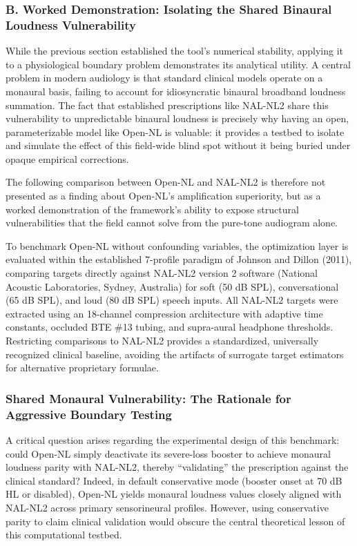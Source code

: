 \documentclass[
  12pt,
]{article}
\begin{document}
\subsubsection{B. Worked Demonstration: Isolating the Shared Binaural
Loudness
Vulnerability}\label{b.-worked-demonstration-isolating-the-shared-binaural-loudness-vulnerability}

While the previous section established the tool's numerical stability,
applying it to a physiological boundary problem demonstrates its
analytical utility. A central problem in modern audiology is that
standard clinical models operate on a monaural basis, failing to account
for idiosyncratic binaural broadband loudness summation. The fact that
established prescriptions like NAL-NL2 share this vulnerability to
unpredictable binaural loudness is precisely why having an open,
parameterizable model like Open-NL is valuable: it provides a testbed to
isolate and simulate the effect of this field-wide blind spot without it
being buried under opaque empirical corrections.

The following comparison between Open-NL and NAL-NL2 is therefore not
presented as a finding about Open-NL's amplification superiority, but as
a worked demonstration of the framework's ability to expose structural
vulnerabilities that the field cannot solve from the pure-tone audiogram
alone.

To benchmark Open-NL without confounding variables, the optimization
layer is evaluated within the established 7-profile paradigm of Johnson
and Dillon (2011), comparing targets directly against NAL-NL2 version 2
software (National Acoustic Laboratories, Sydney, Australia) for soft
(50 dB SPL), conversational (65 dB SPL), and loud (80 dB SPL) speech
inputs. All NAL-NL2 targets were extracted using an 18-channel
compression architecture with adaptive time constants, occluded BTE \#13
tubing, and supra-aural headphone thresholds. Restricting comparisons to
NAL-NL2 provides a standardized, universally recognized clinical
baseline, avoiding the artifacts of surrogate target estimators for
alternative proprietary formulae.

\subsubsection{Shared Monaural Vulnerability: The Rationale for
Aggressive Boundary
Testing}\label{shared-monaural-vulnerability-the-rationale-for-aggressive-boundary-testing}

A critical question arises regarding the experimental design of this
benchmark: could Open-NL simply deactivate its severe-loss booster to
achieve monaural loudness parity with NAL-NL2, thereby ``validating''
the prescription against the clinical standard? Indeed, in default
conservative mode (booster onset at 70 dB HL or disabled), Open-NL
yields monaural loudness values closely aligned with NAL-NL2 across
primary sensorineural profiles. However, using conservative parity to
claim clinical validation would obscure the central theoretical lesson
of this computational testbed.
\end{document}
